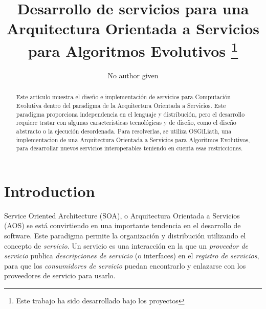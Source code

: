 \documentclass[runningheads]{llncs}
\begin{document}
\mainmatter  %



\title{Desarrollo de servicios para una Arquitectura Orientada a Servicios para Algoritmos Evolutivos \thanks{Este trabajo ha sido desarrollado bajo los proyectos 
}}

\author{No author given}

%







\maketitle
\begin{abstract}
Este artículo muestra el diseño e implementación de servicios para Computación Evolutiva dentro del paradigma de la Arquitectura Orientada a Servicios. Este paradigma proporciona independencia en el lenguaje y distribución, pero el desarrollo requiere tratar con algunas características tecnológicas y de diseño, como el diseño abstracto o la ejecución desordenada. Para resolverlas, se utiliza OSGiLiath, una implementacion de una Arquitectura Orientada a Servicios para Algoritmos Evolutivos, para desarrollar nuevos servicios interoperables teniendo en cuenta esas restricciones.
\end{abstract}


\section{Introduction}
\noindent Service Oriented Architecture (SOA), o Arquitectura Orientada a Servicios (AOS) \cite{PAPAZOGLOU} se está convirtiendo en una importante tendencia en el desarrollo de software. Este paradigma permite la organización y distribución utilizando el concepto de {\em servicio}. Un servicio es una interacción en la que un {\em proveedor de servicio} publica {\em descripciones de servicio} (o interfaces) en el {\em registro de servicios}, para que los {\em consumidores de servicio} puedan encontrarlo y enlazarse con los proveedores de servicio para usarlo.
\end{document}
